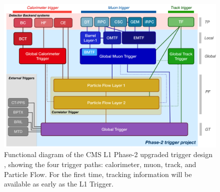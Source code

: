 \begin{figure}[ht]
    \centering
    \includegraphics[width=15cm]{figures/ch-4-phase2/phase-2-l1-architecture.png}
    \caption[Functional diagram of the CMS L1 Phase-2 upgraded trigger design.]{Functional diagram of the CMS L1 Phase-2 upgraded trigger design \cite{CMS-TDR-021}, showing the four trigger paths: calorimeter, muon, track, and Particle Flow. For the first time, tracking information will be available as early as the L1 Trigger.}
    \label{fig:phase-2-l1-architecture}
\end{figure}

